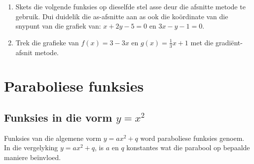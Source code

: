 \begin{exercises}{}
{\begin{enumerate}[noitemsep, label=\textbf{\arabic*}. ]
\begin{figure}[H]
\end{figure}   
\item Skets die volgende funksies op dieselfde stel asse deur die afsnitte metode te gebruik. Dui duidelik die as-afsnitte aan as ook die ko\"ordinate van die snypunt van die grafiek van: $x+2y-5=0$ en $3x-y-1=0$.
\item Trek die grafieke van $f(x)=3-3x$ en $g(x)=\frac{1}{3}x+1$ met die gradi\"ent-afsnit metode.
\end{enumerate}

}
\end{exercises}
   

\section{Paraboliese funksies}
\subsection*{Funksies in die vorm $y={x}^{2}$}      
Funksies van die algemene vorm  $y=a{x}^{2}+q$  word paraboliese funksies genoem. In die vergelyking $y=a{x}^{2}+q$, is $a$ en $q$ konstantes wat die parabool op bepaalde maniere be\"invloed. 
\par
{}


